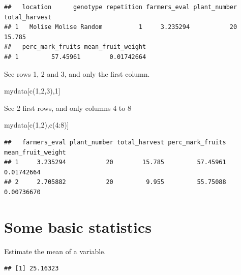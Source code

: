 \documentclass[
]{book}
\newenvironment{Shaded}{\begin{snugshade}}{\end{snugshade}}
\newcommand{\DecValTok}[1]{\textcolor[rgb]{0.00,0.00,0.81}{#1}}
\newcommand{\FunctionTok}[1]{\textcolor[rgb]{0.00,0.00,0.00}{#1}}
\newcommand{\NormalTok}[1]{#1}
\newcommand{\SpecialCharTok}[1]{\textcolor[rgb]{0.00,0.00,0.00}{#1}}
\begin{document}
\begin{verbatim}
##   location      genotype repetition farmers_eval plant_number total_harvest
## 1   Molise Molise Random          1     3.235294           20        15.785
##   perc_mark_fruits mean_fruit_weight
## 1         57.45961        0.01742664
\end{verbatim}

See rows 1, 2 and 3, and only the first column.

\begin{Shaded}
\begin{Highlighting}[]
\NormalTok{mydata[}\FunctionTok{c}\NormalTok{(}\DecValTok{1}\NormalTok{,}\DecValTok{2}\NormalTok{,}\DecValTok{3}\NormalTok{),}\DecValTok{1}\NormalTok{]}
\end{Highlighting}
\end{Shaded}

See 2 first rows, and only columns 4 to 8

\begin{Shaded}
\begin{Highlighting}[]
\NormalTok{mydata[}\FunctionTok{c}\NormalTok{(}\DecValTok{1}\NormalTok{,}\DecValTok{2}\NormalTok{),}\FunctionTok{c}\NormalTok{(}\DecValTok{4}\SpecialCharTok{:}\DecValTok{8}\NormalTok{)]}
\end{Highlighting}
\end{Shaded}

\begin{verbatim}
##   farmers_eval plant_number total_harvest perc_mark_fruits mean_fruit_weight
## 1     3.235294           20        15.785         57.45961        0.01742664
## 2     2.705882           20         9.955         55.75088        0.00736670
\end{verbatim}

\hypertarget{some-basic-statistics}{%
\section{Some basic statistics}\label{some-basic-statistics}}

Estimate the mean of a variable.

\begin{Shaded}
\end{Shaded}

\begin{verbatim}
## [1] 25.16323
\end{verbatim}
\end{document}
